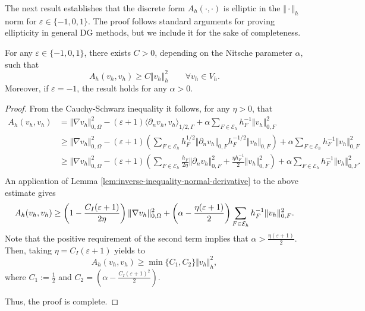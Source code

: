 \documentclass[onefignum,onetabnum,final]{siamart250211}
\numberwithin{equation}{section}
\newcommand\0{\boldsymbol{0}}
\renewcommand\O{\Omega}
\def\CE{{\mathcal E}}
\begin{document}
	The next result establishes that the discrete form $A_h(\cdot,\cdot)$ is
	elliptic in the $\Vert\cdot\Vert_{h}$ norm for $\varepsilon\in\{-1,0,1\}$. The proof follows standard arguments for proving ellipticity in general DG methods, but we include it for the sake of completeness.
	\begin{lemma}
		\label{eliptD}
		For any $\varepsilon\in\{-1,0,1\}$,
		there exists $C>0$, depending on the Nitsche parameter $\alpha$, such that
		$$
		A_h(v_h,v_h)
		\ge C\Vert v_h\Vert_{h}^2
		\qquad\forall v_h\in V_h.
		$$
		Moreover, if $\varepsilon=-1$, the result holds for any $\alpha>0$.
	\end{lemma}
	\begin{proof}
		From the Cauchy-Schwarz inequality it follows, for any $\eta>0$, that
		$$
		\begin{aligned}
			A_h(v_h,v_h)&=\Vert \nabla v_h\Vert_{0,\O}^2- (\varepsilon+ 1) \langle \partial_n v_h,v_h\rangle_{1/2,\Gamma} + \alpha  \sum_{F\in\CE_h} h_F^{-1}\Vert v_h\Vert_{0,F}^2\\
			&\geq \Vert \nabla v_h\Vert_{0,\O}^2- (\varepsilon+ 1)\left(\sum_{F\in\CE_h} h_F^{1/2}\Vert \partial_n v_h \Vert_{0,F} h_F^{-1/2}\Vert v_h\Vert_{0,F}\right) + \alpha  \sum_{F\in\CE_h} h_F^{-1}\Vert v_h\Vert_{0,F}^2\\
			&\geq \Vert \nabla v_h\Vert_{0,\O}^2- (\varepsilon+ 1)\left(\sum_{F\in\CE_h} \frac{h_F}{2\eta}\Vert \partial_n v_h \Vert_{0,F}^2 +  \frac{\eta h_F^{-1}}{2}\Vert v_h\Vert_{0,F}^2\right) + \alpha  \sum_{F\in\CE_h} h_F^{-1}\Vert v_h\Vert_{0,F}^2.\\
		\end{aligned}
		$$
		An application of Lemma \ref{lem:inverse-inequality-normal-derivative} to the above estimate gives
		$$
		A_h(v_h,v_h)\geq \left(1 - \frac{C_I(\varepsilon+1)}{2\eta}\right)\Vert \nabla v_h\Vert_{0,\O}^2  + \left(\alpha - \frac{\eta(\varepsilon+1)}{2}\right)  \sum_{F\in\CE_h} h_F^{-1}\Vert v_h\Vert_{0,F}^2.\\
		$$
		Note that the positive requirement of the second term implies that $\alpha > \frac{\eta(\varepsilon + 1)}{2}$. Then, taking $\eta=C_I(\varepsilon+1)$ yields to
		$$
		A_h(v_h,v_h)\geq \min\{C_1,C_2\}\Vert v_h\Vert_{h}^2,
		$$
		where $C_1:=\frac{1}{2}$ and $C_2=\left(\alpha - \frac{C_I(\varepsilon+1)^2}{2}\right)$.
		
		Thus, the proof is complete.
	\end{proof}
	
\end{document}
